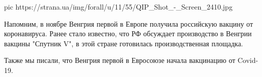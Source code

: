 \ifcmt
  pic https://strana.ua/img/forall/u/11/55/QIP_Shot_-_Screen_2410.jpg
\fi

Напомним, в ноябре Венгрия первой в Европе получила российскую вакцину от
коронавируса. Ранее стало известно, что РФ обсуждает производство в Венгрии
вакцины "Спутник V", в этой стране готовилась производственная площадка.

Также мы писали, что Венгрия первой в Евросоюзе начала вакцинацию от Covid-19.


